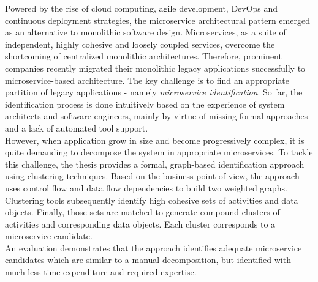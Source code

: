 

\Abstract
Powered by the rise of cloud computing, agile development, DevOps and continuous deployment strategies, the microservice architectural pattern emerged as an alternative to monolithic software design. Microservices, as a suite of independent, highly cohesive and loosely coupled services, overcome the shortcoming of centralized monolithic architectures. Therefore, prominent companies recently migrated their monolithic legacy applications successfully to microservice-based architecture. The key challenge is to find an appropriate partition of legacy applications - namely \textit{microservice identification}. So far, the identification process is done intuitively based on the experience of system architects and software engineers, mainly by virtue of missing formal approaches and a lack of automated tool support. \\
However, when application grow in size and become progressively complex, it is quite demanding to decompose the system in appropriate microservices.
To tackle this challenge, the thesis provides a formal, graph-based identification approach using clustering techniques. Based on the business point of view, the approach uses control flow and data flow dependencies to build two weighted graphs. Clustering tools subsequently identify high cohesive sets of activities and data objects. Finally, those sets are matched to generate compound clusters of activities and corresponding data objects. Each cluster corresponds to a microservice candidate. \\
An evaluation demonstrates that the approach identifies adequate microservice candidates which are similar to a manual decomposition, but identified with much less time expenditure and required expertise.


